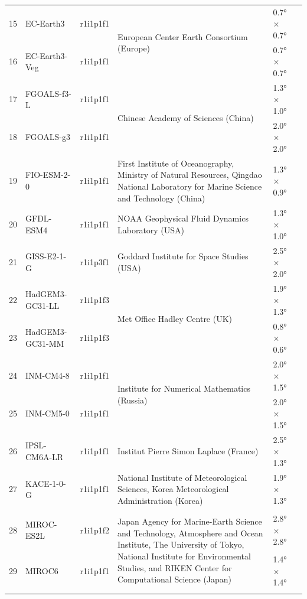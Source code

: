 \documentclass[pdflatex,sn-chicago]{sn-jnl}%
\theoremstyle{thmstyleone}%
\theoremstyle{thmstyletwo}%
\theoremstyle{thmstylethree}%
\begin{document}
\begin{table}
{\begin{tabularx}{1.27\textwidth}{p{.5cm} p{2.6cm} p{1.1cm} p{5.7cm} p{1.5cm} l}
\midrule
15 & EC-Earth3 & r1i1p1f1 & \multirow{2}{=}{European Center Earth Consortium (Europe)} & 0.7° × 0.7° & \multirow{2}{=}{\citet{EC-Earth3}} \\
16 & EC-Earth3-Veg & r1i1p1f1 & & 0.7° × 0.7° &  \\
\midrule
17 & FGOALS-f3-L & r1i1p1f1 & \multirow{2}{=}{Chinese Academy of Sciences (China)} & 1.3° × 1.0° & \citet{FGOALS-f3} \\
18 & FGOALS-g3 & r1i1p1f1 & & 2.0° × 2.0° & \citet{FGOALS-g3} \\
\midrule
19 & FIO-ESM-2-0 & r1i1p1f1 & First Institute of Oceanography, Ministry of Natural Resources, Qingdao National Laboratory for Marine Science and Technology (China) & 1.3° × 0.9° & \citet{FIO-ESM-2} \\
\midrule
20 & GFDL-ESM4 & r1i1p1f1 & NOAA Geophysical Fluid Dynamics Laboratory (USA) & 1.3° × 1.0° & \citet{GFDL-ESM4} \\
\midrule
21 & GISS-E2-1-G & r1i1p3f1 & Goddard Institute for Space Studies (USA) & 2.5° × 2.0° & \citet{GISS‐E2} \\
\midrule
22 & HadGEM3-GC31-LL & r1i1p1f3 & \multirow{2}{=}{Met Office Hadley Centre (UK)} & 1.9° × 1.3° & \multirow{2}{=}{\citet{HadGEM3-GC31}} \\
23 & HadGEM3-GC31-MM & r1i1p1f3 & & 0.8° × 0.6° &  \\
\midrule
24 & INM-CM4-8 & r1i1p1f1 & \multirow{2}{=}{Institute for Numerical Mathematics (Russia)} & 2.0° × 1.5° & \citet{INM-CM48} \\
25 & INM-CM5-0 & r1i1p1f1 & & 2.0° × 1.5° & \citet{INM-CM5} \\
\midrule
26 & IPSL-CM6A-LR & r1i1p1f1 & Institut Pierre Simon Laplace (France) & 2.5° × 1.3° & \citet{IPSL‐CM6A} \\
\midrule
27 & KACE-1-0-G & r1i1p1f1 & National Institute of Meteorological Sciences, Korea Meteorological Administration (Korea) & 1.9° × 1.3° & \citet{KACE-1} \\
\midrule
 & & & \multirow{5}{=}{Japan Agency for Marine-Earth Science and Technology, Atmosphere and Ocean Institute, The University of Tokyo, National Institute for Environmental Studies, and RIKEN Center for Computational Science (Japan)}& & \\
28 & MIROC-ES2L & r1i1p1f2 & & 2.8° × 2.8° & \citet{MIROC-ES2L} \\
 & & & & & \\
29 & MIROC6 & r1i1p1f1 & & 1.4° × 1.4° & \citet{MIROC6} \\
 & & & & \\

\end{tabularx}}
\end{table}
\end{document}
